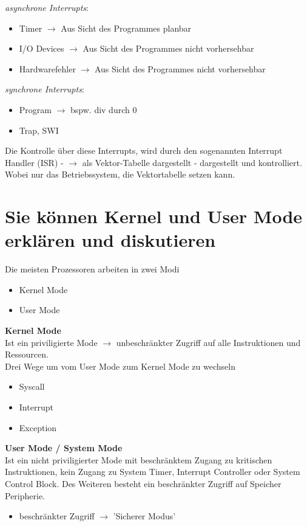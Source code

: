 \documentclass{report}
\theoremstyle{definition}
\theoremstyle{example}
\begin{document}
\textit{asynchrone Interrupts}:
\begin{itemize}
	\item Timer $\rightarrow$ Aus Sicht des Programmes planbar
	\item I/O Devices $\rightarrow$ Aus Sicht des Programmes nicht vorhersehbar
	\item Hardwarefehler $\rightarrow$ Aus Sicht des Programmes nicht vorhersehbar
\end{itemize}

\textit{synchrone Interrupts}:
\begin{itemize}
	\item Program $\rightarrow$ bspw. div durch 0
	\item Trap, SWI
\end{itemize}

Die Kontrolle über diese Interrupts, wird durch den sogenannten Interrupt Handler (ISR) - $\rightarrow$ als Vektor-Tabelle dargestellt - dargestellt und kontrolliert. Wobei nur das Betriebssystem, die Vektortabelle setzen kann.

\section{Sie können Kernel und User Mode erklären und diskutieren}
Die meisten Prozessoren arbeiten in zwei Modi\\

\begin{itemize}
	\item Kernel Mode
	\item User Mode
\end{itemize}

\textbf{Kernel Mode}\\
Ist ein priviligierte Mode $\rightarrow$ unbeschränkter Zugriff auf alle Instruktionen und Ressourcen.\\
Drei Wege um vom User Mode zum Kernel Mode zu wechseln
\begin{itemize}
	\item Syscall
	\item Interrupt
	\item Exception
\end{itemize}

\textbf{User Mode / System Mode}\\
Ist ein nicht priviligierter Mode mit beschränktem Zugang zu kritischen Instruktionen, kein Zugang zu System Timer, Interrupt Controller oder System Control Block. Des Weiteren besteht ein beschränkter Zugriff auf Speicher Peripherie.
\begin{itemize}
	\item beschränkter Zugriff $\rightarrow$ 'Sicherer Modus'
\end{itemize}
\end{document}
